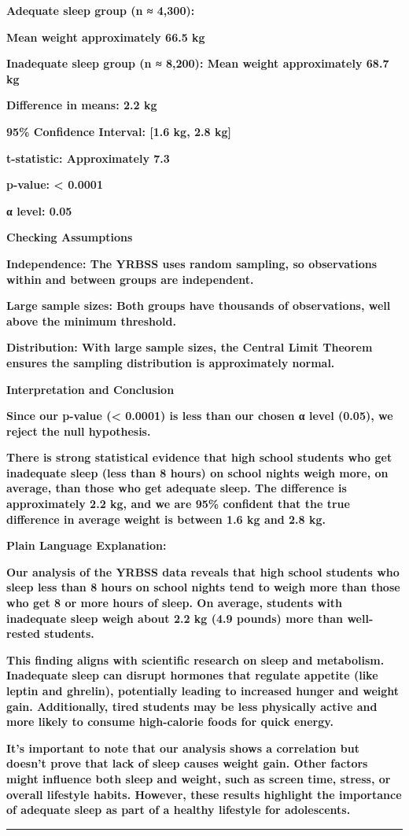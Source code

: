 \documentclass[
]{article}
\begin{document}
\textbf{Adequate sleep group (n ≈ 4,300):}

\textbf{Mean weight approximately 66.5 kg}

\textbf{Inadequate sleep group (n ≈ 8,200): Mean weight approximately
68.7 kg}

\textbf{Difference in means: 2.2 kg}

\textbf{95\% Confidence Interval: {[}1.6 kg, 2.8 kg{]}}

\textbf{t-statistic: Approximately 7.3}

\textbf{p-value: \textless{} 0.0001}

\textbf{α level: 0.05}

\textbf{Checking Assumptions}

\textbf{Independence: The YRBSS uses random sampling, so observations
within and between groups are independent.}

\textbf{Large sample sizes: Both groups have thousands of observations,
well above the minimum threshold.}

\textbf{Distribution: With large sample sizes, the Central Limit Theorem
ensures the sampling distribution is approximately normal.}

\textbf{Interpretation and Conclusion}

\textbf{Since our p-value (\textless{} 0.0001) is less than our chosen α
level (0.05), we reject the null hypothesis.}

\textbf{There is strong statistical evidence that high school students
who get inadequate sleep (less than 8 hours) on school nights weigh
more, on average, than those who get adequate sleep. The difference is
approximately 2.2 kg, and we are 95\% confident that the true difference
in average weight is between 1.6 kg and 2.8 kg.}

\textbf{Plain Language Explanation:}

\textbf{Our analysis of the YRBSS data reveals that high school students
who sleep less than 8 hours on school nights tend to weigh more than
those who get 8 or more hours of sleep. On average, students with
inadequate sleep weigh about 2.2 kg (4.9 pounds) more than well-rested
students.}

\textbf{This finding aligns with scientific research on sleep and
metabolism. Inadequate sleep can disrupt hormones that regulate appetite
(like leptin and ghrelin), potentially leading to increased hunger and
weight gain. Additionally, tired students may be less physically active
and more likely to consume high-calorie foods for quick energy.}

\textbf{It's important to note that our analysis shows a correlation but
doesn't prove that lack of sleep causes weight gain. Other factors might
influence both sleep and weight, such as screen time, stress, or overall
lifestyle habits. However, these results highlight the importance of
adequate sleep as part of a healthy lifestyle for adolescents.}

\begin{center}\rule{0.5\linewidth}{0.5pt}\end{center}
\end{document}
